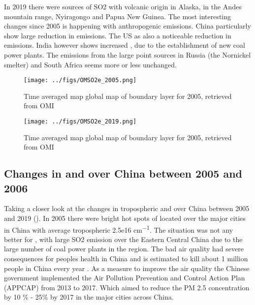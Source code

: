 In 2019  there were sources of SO2 with volcanic origin in 
Alaska, in  the Andes mountain range, Nyiragongo and Papua New Guinea. The most interesting 
changes since 2005 is happening with anthropogenic emissions. China particularly show large 
reduction in  emissions. The US as also a noticeable reduction in emissions. India 
however shows increased , due to the establishment of new coal power plants. The 
emissions from the large point sources in Russia (the Nornickel smelter) and South Africa 
seems more or less unchanged. 
\begin{figure}[htbp]
    \centering
        \texttt{[image: ../figs/OMSO2e\_2005.png]}
    \caption{Time averaged map global map of boundary layer  for 2005, retrieved from OMI}
    \label{fig:OMI_global_2005SO2}
\end{figure}

\begin{figure}[htbp]
    \centering
        \texttt{[image: ../figs/OMSO2e\_2019.png]}
    \caption{Time averaged map global map of boundary layer  for 2005, retrieved from OMI}
    \label{fig:OMI_global_2019SO2}
\end{figure}

\subsection*{Changes in  and  over China between 2005 and 2006}

Taking a closer look at the changes in tropospheric  and  over China
between 2005 and 2019 (). In 2005 
there were bright hot spots of  located
over the major cities in China with average tropospheric
 2.5e16 \si{cm^{-1}}. The situation was not any better for , with large \ch
{SO2} emission over the Eastern Central China due to the large number of coal power plants in 
the region. The bad air quality had severe consequences 
for peoples health in China and is estimated to kill about 1 million people in 
China every year \parencite{yue2020stronger}. As a measure to improve the 
air quality the Chinese government implemented the Air Pollution 
Prevention and Control Action Plan (APPCAP) from 2013 to 2017. Which 
aimed to reduce the PM 2.5 concentration by 10 \% - 25\% by 2017 in the major cities across China.      

